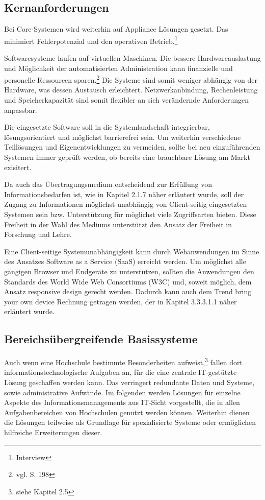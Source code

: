 \subsection{Kernanforderungen}
Bei Core-Systemen wird weiterhin auf Appliance Lösungen gesetzt. Das minimiert Fehlerpotenzial und den operativen Betrieb.\footnote{Interview}

Softwaresysteme laufen auf virtuellen Maschinen. Die bessere Hardwareauslastung und Möglichkeit der automatisierten Administration kann finanzielle und personelle Ressourcen sparen.\footnote{vgl. \cite{baun_servervirtualisierung_2009} S. 198} Die Systeme sind somit weniger abhängig von der Hardware, was dessen Austausch erleichtert. Netzwerkanbindung, Rechenleistung und Speicherkapazität sind somit flexibler an sich verändernde Anforderungen anpassbar.

Die eingesetzte Software soll in die Systemlandschaft integrierbar, lösungsorientiert und möglichst barrierefrei sein. Um weiterhin verschiedene Teillösungen und Eigenentwicklungen zu vermeiden, sollte bei neu einzuführenden Systemen immer geprüft werden, ob bereits eine brauchbare Lösung am Markt exisitert.

Da auch das Übertragungsmedium entscheidend zur Erfüllung von Informationsbedarfen ist, wie in Kapitel 2.1.7 näher erläutert wurde, soll der Zugang zu Informationen möglichst unabhängig von Client-seitig eingesetzten Systemen sein bzw. Unterstützung für möglichst viele Zugriffsarten bieten. Diese Freiheit in der Wahl des Mediums unterstützt den Ansatz der Freiheit in Forschung und Lehre.

Eine Client-seitige Systemunabhängigkeit kann durch Webanwendungen im Sinne des Ansatzes Software as a Service (SaaS) erreicht werden. Um möglichst alle gängigen Browser und Endgeräte zu unterstützen, sollten die Anwendungen den Standards des World Wide Web Consortiums (W3C) und, soweit möglich, dem Ansatz responsive design gerecht werden. Dadurch kann auch dem Trend bring your own device Rechnung getragen werden, der in Kapitel 3.3.3.1.1 näher erläutert wurde.

\subsection{Bereichsübergreifende Basissysteme}
Auch wenn eine Hochschule bestimmte Besonderheiten aufweist,\footnote{siehe Kapitel 2.5} fallen dort informationstechnologische Aufgaben an, für die eine zentrale IT-gestützte Lösung geschaffen werden kann. Das verringert redundante Daten und Systeme, sowie administrative Aufwände. Im folgenden werden Lösungen für einzelne Aspekte des Informationsmanagements aus IT-Sicht vorgestellt, die in allen Aufgabenbereichen von Hochschulen genutzt werden können. Weiterhin dienen die Lösungen teilweise als Grundlage für spezialisierte Systeme oder ermöglichen hilfreiche Erweiterungen dieser.

